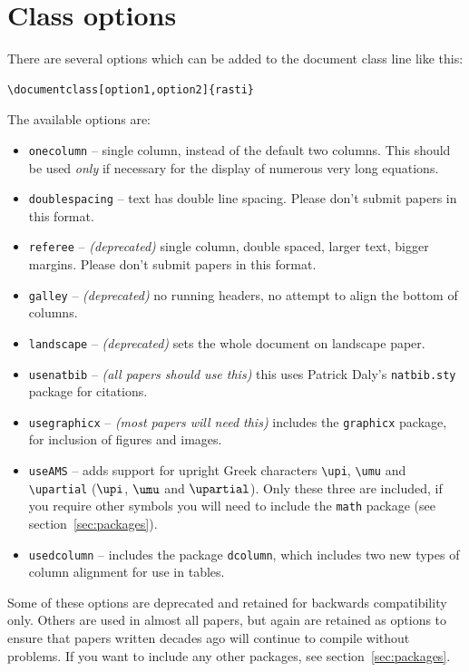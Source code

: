 \documentclass[fleqn,usenatbib,useAMS]{rasti}
\begin{document}
\section{Class options}
\label{sec:options}
There are several options which can be added to the document class line like this:

\begin{verbatim}
\documentclass[option1,option2]{rasti}
\end{verbatim}
The available options are:
\begin{itemize}
\item \verb'onecolumn' -- single column, instead of the default two columns. This should be used {\it only} if necessary for the display of numerous very long equations.
\item \verb'doublespacing' -- text has double line spacing. Please don't submit papers in this format.
\item \verb'referee' -- \textit{(deprecated)} single column, double spaced, larger text, bigger margins. Please don't submit papers in this format.
\item \verb'galley' -- \textit{(deprecated)} no running headers, no attempt to align the bottom of columns.
\item \verb'landscape' -- \textit{(deprecated)} sets the whole document on landscape paper.
\item \verb"usenatbib" -- \textit{(all papers should use this)} this uses Patrick Daly's \verb"natbib.sty" package for citations.
\item \verb"usegraphicx" -- \textit{(most papers will need this)} includes the \verb'graphicx' package, for inclusion of figures and images.
\item \verb'useAMS' -- adds support for upright Greek characters \verb'\upi', \verb'\umu' and \verb'\upartial' ($\upi$, $\umu$ and $\upartial$). Only these three are included, if you require other symbols you will need to include the \verb'math' package (see section~\ref{sec:packages}).
\item \verb"usedcolumn" -- includes the package \verb"dcolumn", which includes two new types of column alignment for use in tables.
\end{itemize}

Some of these options are deprecated and retained for backwards compatibility only.
Others are used in almost all papers, but again are retained as options to ensure that papers written decades ago will continue to compile without problems.
If you want to include any other packages, see section~\ref{sec:packages}.
\end{document}
